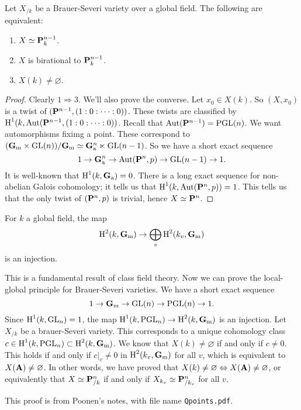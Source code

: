 \begin{theorem}
Let $X_{/k}$ be a Brauer-Severi variety over a global field. The following are 
equivalent:
\begin{enumerate}
  \item $X\simeq \mathbf{P}^{n-1}_k$. 
  \item $X$ is birational to $\mathbf{P}^{n-1}_k$. 
  \item $X(k)\ne\varnothing$. 
\end{enumerate}
\end{theorem}
\begin{proof}
Clearly $1\Rightarrow 3$. We'll also prove the converse. Let $x_0\in X(k)$. 
So $(X,x_0)$ is a twist of $(\mathbf{P}^{n-1},(1:0:\cdots:0))$. These twists are 
classified by $\operatorname{H}^1(k,\operatorname{Aut}(\mathbf{P}^{n-1},(1:0:\cdots:0))$. Recall that 
$\operatorname{Aut}(\mathbf{P}^{n-1})=\operatorname{PGL}(n)$. We want automorphisms fiximg a point. 
These correspond to $(\mathbf{G}_\mathrm{m}\times \operatorname{GL}(n))/\mathbf{G}_\mathrm{m}\simeq \mathbf{G}_\mathrm{a}^n\ltimes\operatorname{GL}(n-1)$. So 
we have a short exact sequence 
\[
  1\to \mathbf{G}_\mathrm{a}^n \to \operatorname{Aut}(\mathbf{P}^n,p) \to \operatorname{GL}(n-1)\to 1 .
\]
It is well-known that $\operatorname{H}^1(k,\mathbf{G}_\mathrm{a})=0$. There is a long exact sequence for 
non-abelian Galois cohomology; it tells us that 
$\operatorname{H}^1(k,\operatorname{Aut}(\mathbf{P}^n,p))=1$. This tells us that the only twist of 
$(\mathbf{P}^n,p)$ is trivial, hence $X\simeq \mathbf{P}^n$. 
\end{proof}


\begin{theorem}
For $k$ a global field, the map 
\[
  \operatorname{H}^2(k,\mathbf{G}_\mathrm{m})\to \bigoplus_v \operatorname{H}^2(k_v,\mathbf{G}_\mathrm{m}) 
\]
is an injection. 
\end{theorem}

This is a fundamental result of class field theory. Now we can prove the 
local-global principle for Brauer-Severi varieties. We have a short exact 
sequence 
\[
  1\to \mathbf{G}_\mathrm{m}\to \operatorname{GL}(n)\to \operatorname{PGL}(n)\to 1 .
\]
Since $\operatorname{H}^1(k,\operatorname{GL}_n)=1$, the map $\operatorname{H}^1(k,\operatorname{PGL}_n)\to \operatorname{H}^2(k,\mathbf{G}_\mathrm{m})$ is an 
injection. Let $X_{/k}$ be a brauer-Severi variety. This corresponds to a 
unique cohomology class $c\in \operatorname{H}^1(k,\operatorname{PGL}_n)\subset \operatorname{H}^2(k,\mathbf{G}_\mathrm{m})$. We know 
that $X(k)\ne\varnothing$ if and only if $c\ne 0$. This holds if and only if 
$c|_v\ne 0$ in $\operatorname{H}^2(k_v,\mathbf{G}_\mathrm{m})$ for all $v$, which is equivalent to 
$X(\mathbf{A})\ne\varnothing$. In other words, we have proved that 
$X(k)\ne\varnothing\Leftrightarrow X(\mathbf{A})\ne\varnothing$, or equivalently that 
$X\simeq \mathbf{P}^n_{/k}$ if and only if $X_{k_v}\simeq \mathbf{P}^n_{/k_v}$ for all $v$. 

This proof is from Poonen's notes, with file name \texttt{Qpoints.pdf}. 

